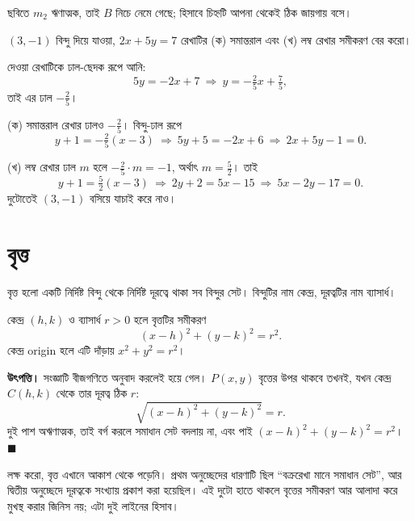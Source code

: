 \documentclass[11pt]{article}
\begin{document}
\noindent
ছবিতে $m_2$ ঋণাত্মক, তাই $B$ নিচে নেমে গেছে; হিসাবে চিহ্নটি আপনা থেকেই ঠিক
জায়গায় বসে।

\begin{example}
$(3, -1)$ বিন্দু দিয়ে যাওয়া, $2x + 5y = 7$ রেখাটির (ক) সমান্তরাল এবং
(খ) লম্ব রেখার সমীকরণ বের করো।
\end{example}

\begin{solbox}
দেওয়া রেখাটিকে ঢাল-ছেদক রূপে আনি:
\[
  5y = -2x + 7 \ \Longrightarrow\ y = -\tfrac{2}{5} x + \tfrac{7}{5},
\]
তাই এর ঢাল $-\tfrac{2}{5}$।

(ক) সমান্তরাল রেখার ঢালও $-\tfrac{2}{5}$। বিন্দু-ঢাল রূপে
\[
  y + 1 = -\tfrac{2}{5}(x - 3)
  \ \Longrightarrow\ 5y + 5 = -2x + 6
  \ \Longrightarrow\ 2x + 5y - 1 = 0 .
\]

(খ) লম্ব রেখার ঢাল $m$ হলে $-\tfrac{2}{5} \cdot m = -1$, অর্থাৎ
$m = \tfrac{5}{2}$। তাই
\[
  y + 1 = \tfrac{5}{2}(x - 3)
  \ \Longrightarrow\ 2y + 2 = 5x - 15
  \ \Longrightarrow\ 5x - 2y - 17 = 0 .
\]
দুটোতেই $(3,-1)$ বসিয়ে যাচাই করে নাও।
\end{solbox}

\section{বৃত্ত}

\begin{idea}[বৃত্তের সমীকরণ]
বৃত্ত হলো একটি নির্দিষ্ট বিন্দু থেকে নির্দিষ্ট দূরত্বে থাকা সব বিন্দুর সেট।
বিন্দুটির নাম কেন্দ্র, দূরত্বটির নাম ব্যাসার্ধ।

কেন্দ্র $(h, k)$ ও ব্যাসার্ধ $r > 0$ হলে বৃত্তটির সমীকরণ
\[
  (x - h)^2 + (y - k)^2 = r^2 .
\]
কেন্দ্র origin হলে এটি দাঁড়ায় $x^2 + y^2 = r^2$।
\end{idea}

\noindent
\textbf{উৎপত্তি।} সংজ্ঞাটি বীজগণিতে অনুবাদ করলেই হয়ে গেল। $P(x,y)$ বৃত্তের
উপর থাকবে তখনই, যখন কেন্দ্র $C(h,k)$ থেকে তার দূরত্ব ঠিক $r$:
\[
  \sqrt{(x-h)^2 + (y-k)^2} = r .
\]
দুই পাশ অঋণাত্মক, তাই বর্গ করলে সমাধান সেট বদলায় না, এবং পাই
$(x-h)^2 + (y-k)^2 = r^2$। $\blacksquare$

\begin{remark}
লক্ষ করো, বৃত্ত এখানে আকাশ থেকে পড়েনি। প্রথম অনুচ্ছেদের ধারণাটি ছিল ``বক্ররেখা
মানে সমাধান সেট'', আর দ্বিতীয় অনুচ্ছেদে দূরত্বকে সংখ্যায় প্রকাশ করা হয়েছিল।
এই দুটো হাতে থাকলে বৃত্তের সমীকরণ আর আলাদা করে মুখস্থ করার জিনিস নয়; এটা দুই
লাইনের হিসাব।
\end{remark}
\end{document}
